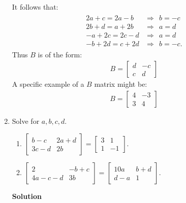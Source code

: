 \begin{enumerate}
\noindent It follows that:
\begin{eqnarray*}
\begin{array}{ll} 2a+c=2a-b&\Rightarrow ~~ b=-c\\
2b+d=a+2b&\Rightarrow ~~ a=d\\ -a+2c=2c-d&\Rightarrow ~~ a=d\\
-b+2d=c+2d&\Rightarrow ~~ b=-c.\end{array}
\end{eqnarray*}
Thus $B$ is of the form:
\begin{eqnarray*}
B= \left[ \begin{array}{rr}d&-c\\
                           c&d\end{array} \right]
\end{eqnarray*}
\noindent A specific example of a $B$ matrix might be:
\begin{eqnarray*}
 B= \left[ \begin{array}{rr}
                           4&-3\\
                           3&4\end{array} \right]
\end{eqnarray*}

\item Solve for $a,b,c,d$.
\begin{enumerate}
\item $\left [ \begin{array}{rr} b-c&2a+d\\ 3c-d&2b~~ \end{array} \right
]=\left [ \begin{array}{rr} 3&1\\1&-1\end{array} \right ].$
\item $\left [ \begin{array}{rr} 2~~~~~~&-b+c\\ 4a-c-d&3b~~ \end{array} \right
]=\left [ \begin{array}{rr} 10a~&b+d\\d-a&1~~\end{array} \right ].$
\end{enumerate}
\noindent \textbf{Solution}
\end{enumerate}
